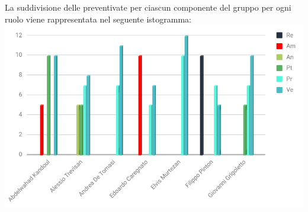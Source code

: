 La suddivisione delle preventivate per ciascun componente del gruppo per ogni ruolo viene rappresentata nel seguente istogramma:\\
\includegraphics[width=1\textwidth]{./src/Preventivo/src/img/IstoValidazione.png}


\clearpage


